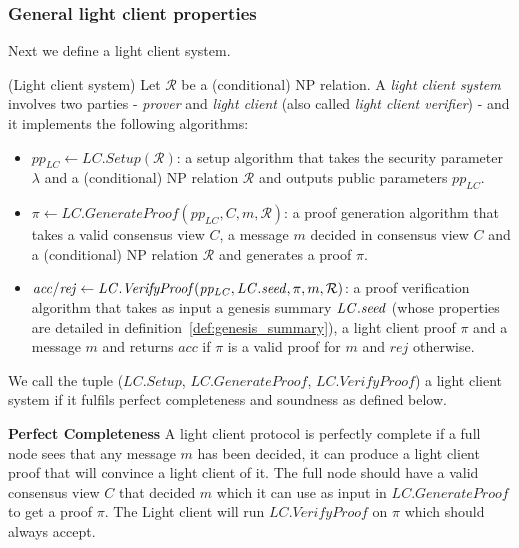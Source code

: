 \subsubsection{General light client properties}

\noindent Next we define a light client system. 
\label{sec:soundness}
  
\begin{dfn}(Light client system)
\label{scheme_light_client} Let $\mathcal{R}$ be a (conditional) NP relation. A \emph{light client system} involves 
two parties - \emph{prover} and \emph{light client} (also called \emph{light client verifier}) - and it implements the following algorithms:
\begin{itemize}
\item $\mathit{pp_{\mathit{LC}}} \leftarrow \mathit{LC.Setup}(\mathcal{R})$: 
a setup algorithm that takes the security parameter $\lambda$ and a (conditional) NP relation $\mathcal{R}$ 
and outputs public parameters $\mathit{pp_{\mathit{LC}}}$.
\item $\pi \leftarrow \mathit{LC.GenerateProof}(\mathit{pp_{\mathit{LC}}}, C, m, \mathcal{R})$: a proof 
generation algorithm that takes a valid consensus view $C$, a message $m$ decided in consensus view $C$ 
and a (conditional) NP relation $\mathcal{R}$ and generates a proof $\pi$.
\item $\mathit{acc}/\mathit{rej}  \leftarrow  \mathit{LC.VerifyProof}(\mathit{pp_{\mathit{LC}}}, \mathit{LC.seed}, \pi, m, \mathcal{R})$: 
a proof verification algorithm that takes as input a genesis summary $\mathit{LC.seed}$ (whose properties are detailed in 
definition~\ref{def:genesis_summary}), a light client proof $\pi$ and a message $m$ and returns $\mathit{acc}$ if $\pi$ is a valid 
proof for $m$ and $\mathit{rej}$ otherwise.
\end{itemize}

\noindent We call the tuple ($\mathit{LC.Setup}$, $\mathit{LC.GenerateProof}$, 
$\mathit{LC.VerifyProof}$) a light client system if it fulfils 
perfect completeness and soundness as defined below. 
\end{dfn}
\noindent \textbf{Perfect Completeness} A light client protocol is perfectly complete if a full node sees that any message $m$ has been decided, it can produce a light client proof that will convince a light client  of it. The full node should have a valid consensus view $C$ that decided $m$ which it can use as input in $LC.GenerateProof$ to get a proof $\pi$. The Light client will run $LC.VerifyProof$ on $\pi$ which should always accept.

